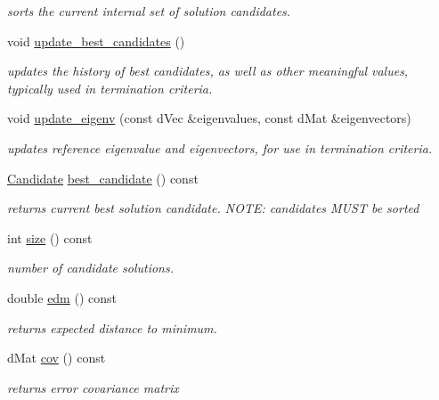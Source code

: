 \begin{DoxyCompactItemize}
\begin{DoxyCompactList}\small\item\em sorts the current internal set of solution candidates. \end{DoxyCompactList}\item 
void \hyperlink{classlibcmaes_1_1CMASolutions_a207c159be5f8668f018d564a1adb8dc8}{update\-\_\-best\-\_\-candidates} ()
\begin{DoxyCompactList}\small\item\em updates the history of best candidates, as well as other meaningful values, typically used in termination criteria. \end{DoxyCompactList}\item 
void \hyperlink{classlibcmaes_1_1CMASolutions_a28a20c0a90712e4f28038af2a4bd320b}{update\-\_\-eigenv} (const d\-Vec \&eigenvalues, const d\-Mat \&eigenvectors)
\begin{DoxyCompactList}\small\item\em updates reference eigenvalue and eigenvectors, for use in termination criteria. \end{DoxyCompactList}\item 
\hyperlink{classlibcmaes_1_1Candidate}{Candidate} \hyperlink{classlibcmaes_1_1CMASolutions_a218f2ee7bbd91d385f23082bfe18b1d9}{best\-\_\-candidate} () const 
\begin{DoxyCompactList}\small\item\em returns current best solution candidate. N\-O\-T\-E\-: candidates M\-U\-S\-T be sorted \end{DoxyCompactList}\item 
int \hyperlink{classlibcmaes_1_1CMASolutions_a7a7e71c54967613717d2928a38715429}{size} () const 
\begin{DoxyCompactList}\small\item\em number of candidate solutions. \end{DoxyCompactList}\item 
double \hyperlink{classlibcmaes_1_1CMASolutions_a33a5f2f6bc03c9b459d58f079a1a2d38}{edm} () const 
\begin{DoxyCompactList}\small\item\em returns expected distance to minimum. \end{DoxyCompactList}\item 
d\-Mat \hyperlink{classlibcmaes_1_1CMASolutions_a8b3cd4f1b85c820190eedbf81f49a441}{cov} () const 
\begin{DoxyCompactList}\small\item\em returns error covariance matrix \end{DoxyCompactList}\item 

\end{DoxyCompactItemize}
